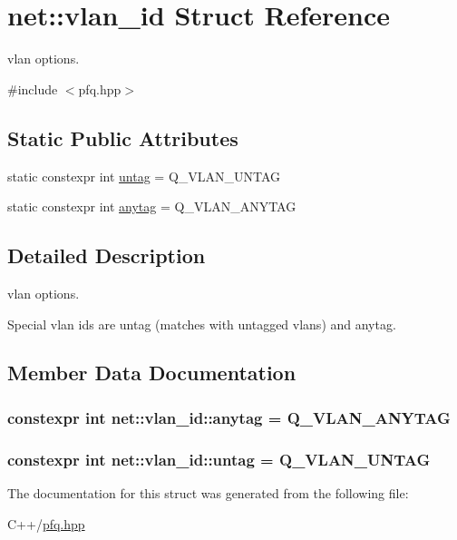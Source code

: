 \hypertarget{structnet_1_1vlan__id}{\section{net\-:\-:vlan\-\_\-id Struct Reference}
\label{structnet_1_1vlan__id}
}


vlan options.  




{\ttfamily \#include $<$pfq.\-hpp$>$}

\subsection*{Static Public Attributes}
\begin{DoxyCompactItemize}
\item 
static constexpr int \hyperlink{structnet_1_1vlan__id_a266d270ff167bffcc68b5baf3fa1254f}{untag} = Q\-\_\-\-V\-L\-A\-N\-\_\-\-U\-N\-T\-A\-G
\item 
static constexpr int \hyperlink{structnet_1_1vlan__id_a020dfecb6821c57a45437f534256d712}{anytag} = Q\-\_\-\-V\-L\-A\-N\-\_\-\-A\-N\-Y\-T\-A\-G
\end{DoxyCompactItemize}


\subsection{Detailed Description}
vlan options. 

Special vlan ids are untag (matches with untagged vlans) and anytag. 

\subsection{Member Data Documentation}
\hypertarget{structnet_1_1vlan__id_a020dfecb6821c57a45437f534256d712}{
\subsubsection[{anytag}]{\setlength{\rightskip}{0pt plus 5cm}constexpr int net\-::vlan\-\_\-id\-::anytag = Q\-\_\-\-V\-L\-A\-N\-\_\-\-A\-N\-Y\-T\-A\-G\hspace{0.3cm}{\ttfamily [static]}}}\label{structnet_1_1vlan__id_a020dfecb6821c57a45437f534256d712}
\hypertarget{structnet_1_1vlan__id_a266d270ff167bffcc68b5baf3fa1254f}{
\subsubsection[{untag}]{\setlength{\rightskip}{0pt plus 5cm}constexpr int net\-::vlan\-\_\-id\-::untag = Q\-\_\-\-V\-L\-A\-N\-\_\-\-U\-N\-T\-A\-G\hspace{0.3cm}{\ttfamily [static]}}}\label{structnet_1_1vlan__id_a266d270ff167bffcc68b5baf3fa1254f}


The documentation for this struct was generated from the following file\-:\begin{DoxyCompactItemize}
\item 
C++/\hyperlink{pfq_8hpp}{pfq.\-hpp}\end{DoxyCompactItemize}
